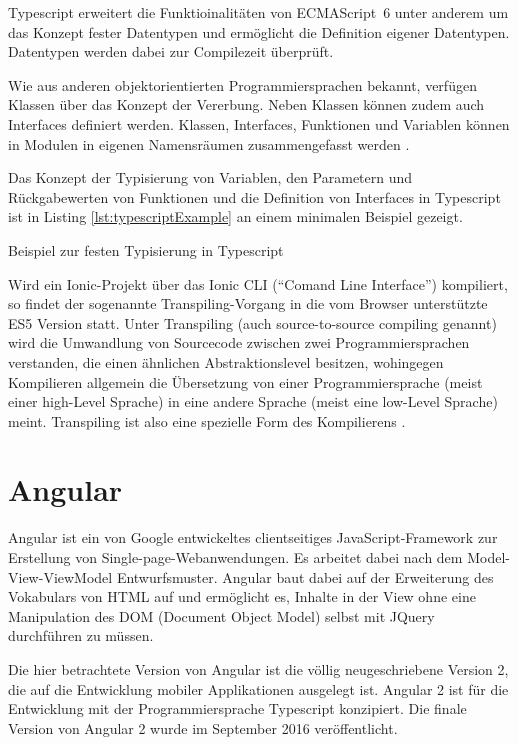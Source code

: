 Typescript erweitert die Funktioinalitäten von ECMAScript~6 unter anderem um das Konzept fester Datentypen und ermöglicht die Definition eigener Datentypen. Datentypen werden dabei zur Compilezeit überprüft.

Wie aus anderen objektorientierten Programmiersprachen bekannt, verfügen Klassen über das Konzept der Vererbung. Neben Klassen können zudem auch Interfaces definiert werden. Klassen, Interfaces, Funktionen und Variablen können in Modulen in eigenen Namensräumen zusammengefasst werden \cite{MicrosoftTypescriptDoku}.

Das Konzept der Typisierung von Variablen, den Parametern und Rückgabewerten von Funktionen und die Definition von Interfaces in Typescript ist in Listing \ref{lst:typescriptExample} an einem minimalen Beispiel gezeigt.

\begin{listing}[htb]
    
    \caption{Beispiel zur festen Typisierung in Typescript}
    \label{lst:typescriptExample}
\end{listing}

Wird ein Ionic-Projekt über das Ionic CLI (\enquote{Comand Line Interface}) kompiliert, so findet der sogenannte Transpiling-Vorgang in die vom Browser unterstützte ES5 Version statt. Unter Transpiling (auch source-to-source compiling genannt) wird die Umwandlung von Sourcecode zwischen zwei Programmiersprachen verstanden, die einen ähnlichen Abstraktionslevel besitzen, wohingegen Kompilieren allgemein die Übersetzung von einer Programmiersprache (meist einer high-Level Sprache) in eine andere Sprache (meist eine low-Level Sprache) meint. Transpiling ist also eine spezielle Form des Kompilierens \cite{TranspilingVsCompiling}.
%
%
\section{Angular}
\label{sec:Angular}
%
Angular ist ein von Google entwickeltes clientseitiges JavaScript-Framework zur Erstellung von Single-page-Webanwendungen. Es arbeitet dabei nach dem Model-View-ViewModel Entwurfsmuster. Angular baut dabei auf der Erweiterung des Vokabulars von HTML auf und ermöglicht es, Inhalte in der View ohne eine Manipulation des DOM (Document Object Model) selbst mit JQuery durchführen zu müssen.

Die hier betrachtete Version von Angular ist die völlig neugeschriebene Version 2, die auf die Entwicklung mobiler Applikationen ausgelegt ist. Angular 2 ist für die Entwicklung mit der Programmiersprache Typescript konzipiert. Die finale Version von Angular 2 wurde im September 2016 veröffentlicht.
%
